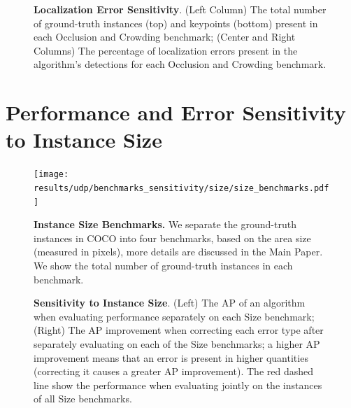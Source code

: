 \documentclass[10pt,onecolumn,letterpaper]{article}
\begin{document}
\begin{figure}[h!]
\centering
{}
\caption{ {\small \textbf{Localization Error Sensitivity}. (Left Column) The total number of ground-truth instances (top) and keypoints (bottom) present
 in each Occlusion and Crowding benchmark; (Center and Right Columns) The percentage of localization errors present in the algorithm's detections for each Occlusion and Crowding benchmark.}}
\end{figure}
\clearpage

\section{Performance and Error Sensitivity to Instance Size}

\begin{figure}[h!]
\centering
\texttt{[image: results/udp/benchmarks\_sensitivity/size/size\_benchmarks.pdf]}
\caption{ {\small \textbf{Instance Size Benchmarks.} We separate the ground-truth instances in COCO into four benchmarks, based on the area size (measured in pixels),
more details are discussed in the Main Paper. We show the total number of ground-truth instances in each benchmark.}}
\end{figure}

\begin{figure}[h!]
\centering
{}
\caption{ {\small \textbf{Sensitivity to Instance Size}.
(Left) The AP of an algorithm when evaluating performance separately on each Size benchmark;
(Right) The AP improvement when correcting each error type after separately evaluating on each of the Size benchmarks;
a higher AP improvement means that an error is present in higher quantities (correcting it causes a greater AP improvement).
The red dashed line show the performance when evaluating jointly on the instances of all Size benchmarks.}}
\end{figure}
\end{document}
